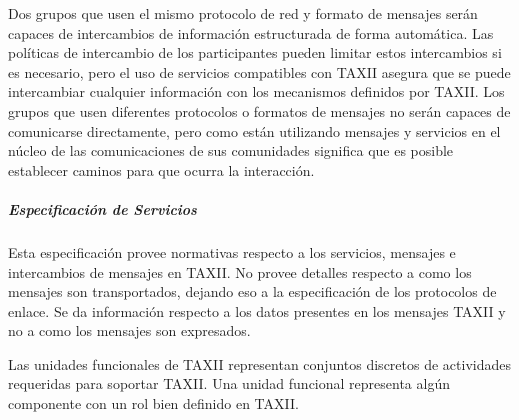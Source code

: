 Dos grupos que usen el mismo protocolo de red y formato de mensajes serán 
capaces de intercambios de información estructurada de forma automática. Las 
políticas de intercambio de los participantes pueden limitar estos intercambios 
si es necesario, pero el uso de servicios compatibles con TAXII asegura que se 
puede intercambiar cualquier información con los mecanismos definidos por TAXII. 
Los grupos que usen diferentes protocolos o formatos de mensajes no serán 
capaces de comunicarse directamente, pero como están utilizando mensajes y 
servicios en el núcleo de las comunicaciones de sus comunidades significa que es 
posible establecer caminos para que ocurra la interacción.

\subparagraph{Especificación de Servicios}

Esta especificación provee normativas respecto a los servicios, mensajes e 
intercambios de mensajes en TAXII. No provee detalles respecto a como los 
mensajes son transportados, dejando eso a la especificación de los protocolos de 
enlace. Se da información respecto a los datos presentes en los mensajes TAXII y 
no a como los mensajes son expresados.

Las unidades funcionales de TAXII representan conjuntos discretos de actividades 
requeridas para soportar TAXII. Una unidad funcional representa algún componente 
con un rol bien definido en TAXII.

